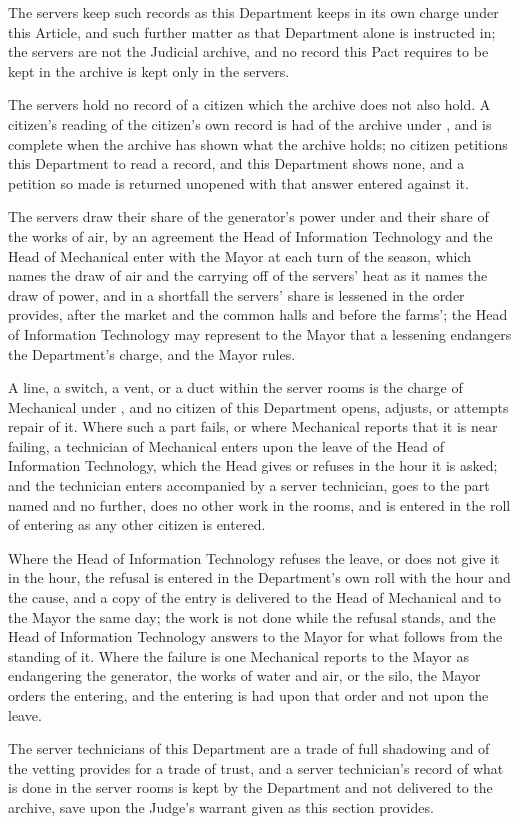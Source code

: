 \begin{clauses}
\item The servers keep such records as this Department keeps in its own charge under this Article, and such further matter as that Department alone is instructed in; the servers are not the Judicial archive, and no record this Pact requires to be kept in the archive is kept only in the servers.
\item The servers hold no record of a citizen which the archive does not also hold. A citizen's reading of the citizen's own record is had of the archive under , and is complete when the archive has shown what the archive holds; no citizen petitions this Department to read a record, and this Department shows none, and a petition so made is returned unopened with that answer entered against it.
\item The servers draw their share of the generator's power under  and their share of the works of air, by an agreement the Head of Information Technology and the Head of Mechanical enter with the Mayor at each turn of the season, which names the draw of air and the carrying off of the servers' heat as it names the draw of power, and in a shortfall the servers' share is lessened in the order  provides, after the market and the common halls and before the farms'; the Head of Information Technology may represent to the Mayor that a lessening endangers the Department's charge, and the Mayor rules.
\item A line, a switch, a vent, or a duct within the server rooms is the charge of Mechanical under , and no citizen of this Department opens, adjusts, or attempts repair of it. Where such a part fails, or where Mechanical reports that it is near failing, a technician of Mechanical enters upon the leave of the Head of Information Technology, which the Head gives or refuses in the hour it is asked; and the technician enters accompanied by a server technician, goes to the part named and no further, does no other work in the rooms, and is entered in the roll of entering as any other citizen is entered.
\item Where the Head of Information Technology refuses the leave, or does not give it in the hour, the refusal is entered in the Department's own roll with the hour and the cause, and a copy of the entry is delivered to the Head of Mechanical and to the Mayor the same day; the work is not done while the refusal stands, and the Head of Information Technology answers to the Mayor for what follows from the standing of it. Where the failure is one Mechanical reports to the Mayor as endangering the generator, the works of water and air, or the silo, the Mayor orders the entering, and the entering is had upon that order and not upon the leave.
\item The server technicians of this Department are a trade of full shadowing and of the vetting  provides for a trade of trust, and a server technician's record of what is done in the server rooms is kept by the Department and not delivered to the archive, save upon the Judge's warrant given as this section provides.
\end{clauses}

